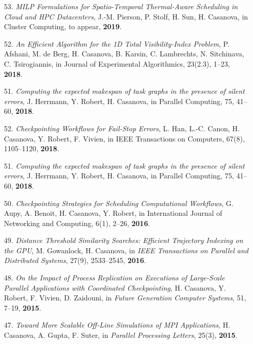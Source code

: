 
\begin{enumerate}


\item [53.] {\it MILP Formulations for Spatio-Temporal Thermal-Aware Scheduling in Cloud and HPC Datacenters},
J.-M. Pierson, P. Stolf, H. Sun, H. Casanova,   
in Cluster Computing, to appear, {\bf 2019}.

\item [52.] {\it An Efficient Algorithm for the 1D Total Visibility-Index
Problem}, P. Afshani, M. de Berg, H. Casanova, B. Karsin, C. Lambrechts, N.
Sitchinava, C. Tsirogiannis, in Journal of Experimental Algorithmics,
        23(2.3), 1--23, {\bf 2018}.

\item [51.] {\it Computing the expected makespan of task graphs in the presence of silent errors}, J. Herrmann, Y. Robert, H. Casanova,  in Parallel Computing, 75, 41--60, {\bf 2018}.

\item [52.] {\it Checkpointing Workflows for Fail-Stop Errors},
L. Han, L.-C. Canon, H. Casanova, Y. Robert, F. Vivien,
in IEEE Transactions on Computers, 67(8), 1105--1120, {\bf 2018}.

\item [51.] {\it Computing the expected makespan of task graphs in the presence of silent errors}, J. Herrmann, Y. Robert, H. Casanova,  in Parallel Computing, 75, 41--60, {\bf 2018}.

\item [50.] {\it Checkpointing Strategies for Scheduling Computational Workflows}, G. Aupy, A. Benoit, H. Casanova, Y.  Robert, in International
Journal of Networking and Computing, 6(1), 2--26, {\bf 2016}.

\item [49.] {\it Distance Threshold Similarity Searches: Efficient
Trajectory Indexing on the GPU}, M. Gowanlock, H. Casanova, in \emph{IEEE
Transactions on Parallel and Distributed Systems}, 27(9), 2533--2545, {\bf 2016}.

\item [48.] {\it On the Impact of Process Replication on Executions of Large-Scale Parallel Applications with Coordinated Checkpointing},
H. Casanova, Y. Robert, F. Vivien, D. Zaidouni, in \emph{ Future Generation
Computer Systems}, 51, 7--19, {\bf 2015}.

\item [47.] {\it Toward More Scalable Off-Line Simulations of MPI Applications}, H. Casanova, A. Gupta, F. Suter, in \emph{Parallel Processing Letters}, 25(3), {\bf 2015}.


\end{enumerate}
